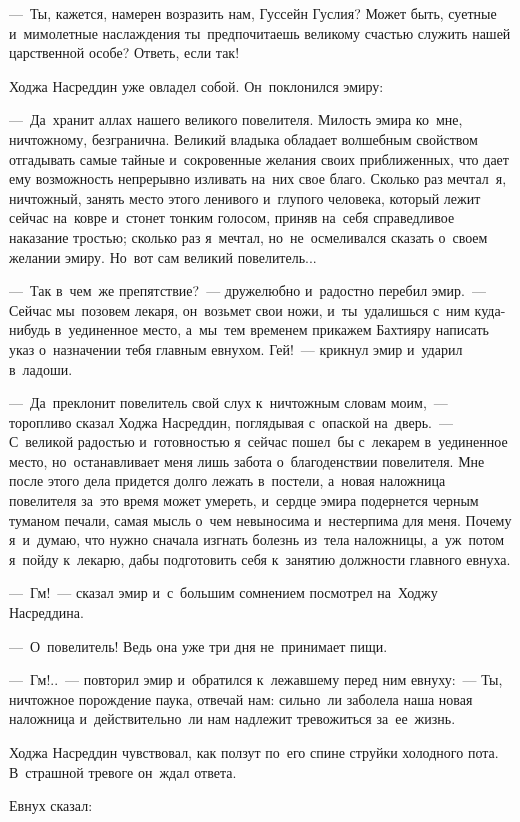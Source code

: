 \documentclass[12pt,a4paper]{book}
\begin{document}
—~Ты, кажется, намерен возразить нам, Гуссейн Гуслия? Может быть, суетные и~мимолетные наслаждения ты~предпочитаешь великому счастью служить нашей царственной особе? Ответь, если так!

Ходжа Насреддин уже овладел собой. Он~поклонился эмиру:

—~Да~хранит аллах нашего великого повелителя. Милость эмира ко~мне, ничтожному, безгранична. Великий владыка обладает волшебным свойством отгадывать самые тайные и~сокровенные желания своих приближенных, что дает ему возможность непрерывно изливать на~них свое благо. Сколько раз мечтал~я, ничтожный, занять место этого ленивого и~глупого человека, который лежит сейчас на~ковре и~стонет тонким голосом, приняв на~себя справедливое наказание тростью; сколько раз я~мечтал, но~не~осмеливался сказать о~своем желании эмиру. Но~вот сам великий повелитель...

—~Так в~чем~же препятствие?~— дружелюбно и~радостно перебил эмир.~— Сейчас мы~позовем лекаря, он~возьмет свои ножи, и~ты~удалишься с~ним куда-нибудь в~уединенное место, а~мы~тем временем прикажем Бахтияру написать указ о~назначении тебя главным евнухом. Гей!~— крикнул эмир и~ударил в~ладоши.

—~Да~преклонит повелитель свой слух к~ничтожным словам моим,~— торопливо сказал Ходжа Насреддин, поглядывая с~опаской на~дверь.~— С~великой радостью и~готовностью я~сейчас пошел~бы с~лекарем в~уединенное место, но~останавливает меня лишь забота о~благоденствии повелителя. Мне после этого дела придется долго лежать в~постели, а~новая наложница повелителя за~это время может умереть, и~сердце эмира подернется черным туманом печали, самая мысль о~чем невыносима и~нестерпима для меня. Почему я~и~думаю, что нужно сначала изгнать болезнь из~тела наложницы, а~уж~потом я~пойду к~лекарю, дабы подготовить себя к~занятию должности главного евнуха.

—~Гм!~— сказал эмир и~с~большим сомнением посмотрел на~Ходжу Насреддина.

—~О~повелитель! Ведь она уже три дня не~принимает пищи.

—~Гм!..~— повторил эмир и~обратился к~лежавшему перед ним евнуху:~— Ты, ничтожное порождение паука, отвечай нам: сильно~ли заболела наша новая наложница и~действительно~ли нам надлежит тревожиться за~ее~жизнь.

Ходжа Насреддин чувствовал, как ползут по~его спине струйки холодного пота. В~страшной тревоге он~ждал ответа.

Евнух сказал:
\end{document}
